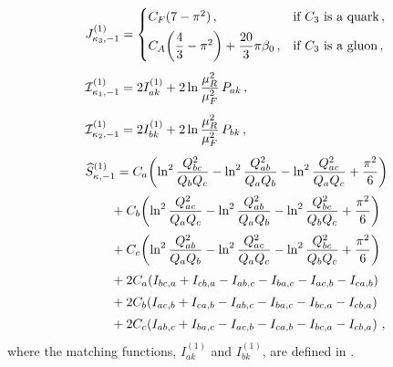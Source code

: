 \begin{subequations}
\label{eq:Cd1-ingred}
\begin{align}
&J_{\kappa_3,-1}^{(1)} = \begin{cases}
    C_F(7-\pi^2)\,, & \text{if $C_3$ is a quark}\,, \\[4pt]
    C_A\!\left(\dfrac{4}{3}-\pi^2\right)+\dfrac{20}{3}\pi\beta_0\,, &\text{if $C_3$ is a gluon}\,,
\end{cases} \\[1ex]
&\mathcal{I}_{\kappa_1,-1}^{(1)} = 2I_{ak}^{(1)}+2\ln\frac{\mu_R^2}{\mu_F^2}\,P_{ak}\,, \\[1ex]
&\mathcal{I}_{\kappa_2,-1}^{(1)} = 2I_{bk}^{(1)}+2\ln\frac{\mu_R^2}{\mu_F^2}\,P_{bk}\,, \\[1ex]
&\widehat{S}_{\kappa,-1}^{(1)}
  = C_a\!\left(\ln^2\frac{Q_{bc}^2}{Q_b Q_c}
     -\ln^2\frac{Q_{ab}^2}{Q_a Q_b}
     -\ln^2\frac{Q_{ac}^2}{Q_a Q_c}+\frac{\pi^2}{6}\right) \notag\\[0.5ex]
  &\qquad+C_b\!\left(\ln^2\frac{Q_{ac}^2}{Q_a Q_c}
     -\ln^2\frac{Q_{ab}^2}{Q_a Q_b}
     -\ln^2\frac{Q_{bc}^2}{Q_b Q_c}+\frac{\pi^2}{6}\right) \notag\\[0.5ex]
  &\qquad+C_c\!\left(\ln^2\frac{Q_{ab}^2}{Q_a Q_b}
     -\ln^2\frac{Q_{ac}^2}{Q_a Q_c}
     -\ln^2\frac{Q_{bc}^2}{Q_b Q_c}+\frac{\pi^2}{6}\right) \notag\\[0.5ex]
  &\qquad+2C_a\!\left(I_{bc,a}+I_{cb,a}-I_{ab,c}-I_{ba,c}-I_{ac,b}-I_{ca,b}\right) \notag\\[0.5ex]
  &\qquad+2C_b\!\left(I_{ac,b}+I_{ca,b}-I_{ab,c}-I_{ba,c}-I_{bc,a}-I_{cb,a}\right) \notag\\[0.5ex]
  &\qquad+2C_c\!\left(I_{ab,c}+I_{ba,c}-I_{ac,b}-I_{ca,b}-I_{bc,a}-I_{cb,a}\right)\,,
\end{align}
\end{subequations}
where the matching functions, $I_{ak}^{(1)}$ and $I_{bk}^{(1)}$, are defined in .

